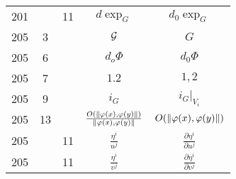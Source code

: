 \documentclass[a4paper,11pt]{article}
\begin{document}
\begin{center}
\begin{tabular}{|c|c|c|c|c|}
    201 & & 11 & $d \exp_{ G }$ & $d_{ 0 } \exp_{ G }$ \\
    205 & \hphantom{0}3 & & $\mathcal{G}$ & $G$ \\
    205 & \hphantom{0}6 & & $d_{ o }\Phi$ & $d_{ 0 }\Phi$ \\
    205 & \hphantom{0}7 & & $1.2$ & $1, 2$ \\
    205 & \hphantom{0}9 & & $i_{ G }$ & $i_{ G }|_{ V_{ i } }$ \\[0.2em]
    205 & 13 & & $\frac{ O( \lVert{  \varphi( x ), \varphi( y )  }\rVert ) }
                 { \lVert{  \varphi( x ), \varphi( y )  }\rVert }$
           & $O( \lVert{  \varphi( x ), \varphi( y )  }\rVert )$ \\[0.5em]
    205 & & 11 & $\frac{ \eta^{ i } }{ u^{ j } }$
           & $\frac{ \partial \eta^{ i } }{ \partial u^{ j } }$ \\[0.5em]
    205 & & 11 & $\frac{ \eta^{ i } }{ v^{ j } }$
           & $\frac{ \partial \eta^{ i } }{ \partial v^{ j } }$ \\[0.3em]
    \hline
  \end{tabular}





  \newpage


\end{center}
\end{document}
